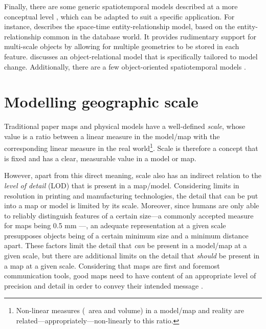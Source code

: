 Finally, there are some generic spatiotemporal models described at a more conceptual level \citep{Story95}, which can be adapted to suit a specific application.
For instance, \citet{Tryfona99} describes the space-time entity-relationship model, based on the entity-relationship \citep{Chen76} common in the database world.
It provides rudimentary support for multi-scale objects by allowing for multiple geometries to be stored in each feature.
\citet{Claramunt99} discusses an object-relational model that is specifically tailored to model change.
Additionally, there are a few object-oriented spatiotemporal models \citep{Worboys90}.

\section{Modelling geographic scale}
\label{se:modelling-scale}

Traditional paper maps and physical models have a well-defined \emph{scale}, whose value is a ratio between a linear measure in the model/map with the corresponding linear measure in the real world\footnote{Non-linear measures (\eg\ area and volume) in a model/map and reality are related---appropriately---non-linearly to this ratio.}.
Scale is therefore a concept that is fixed and has a clear, measurable value in a model or map.

However, apart from this direct meaning, scale also has an indirect relation to the \emph{level of detail} (LOD) that is present in a map/model.
Considering limits in resolution in printing and manufacturing technologies, the detail that can be put into a map or model is limited by its scale.
Moreover, since humans are only able to reliably distinguish features of a certain size---a commonly accepted measure for maps being 0.5 mm \citep{Goodchild01}---, an adequate representation at a given scale presupposes objects being of a certain minimum size and a minimum distance apart.
These factors limit the detail that \emph{can} be present in a model/map at a given scale, but there are additional limits on the detail that \emph{should} be present in a map at a given scale.
Considering that maps are first and foremost communication tools, good maps need to have content of an appropriate level of precision and detail in order to convey their intended message \citep{Hardy12}.

